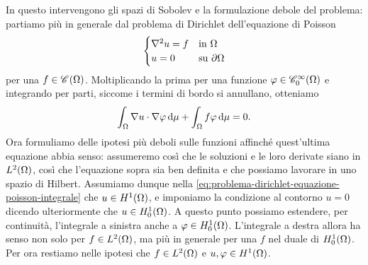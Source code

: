 In questo intervengono gli spazi di Sobolev e la formulazione debole del problema: partiamo più in generale dal problema di Dirichlet dell'equazione di Poisson
\begin{equation}
    \begin{cases}
        \lap u=f & \text{in }\Omega\\
        u=0      & \text{su }\boundary\Omega
    \end{cases}
    \label{eq:problema-dirichlet-equazione-poisson}
\end{equation}
per una $f\in\cont{\Omega}$.
Moltiplicando la prima per una funzione $\phi\in\contsc[\infty]{\Omega}$ e integrando per parti, siccome i termini di bordo si annullano, otteniamo
\begin{equation}
    \int_\Omega\scalar{\grad u}{\grad\phi}\,\dd\mu+\int_\Omega f\phi\,\dd\mu=0.
    \label{eq:problema-dirichlet-equazione-poisson-integrale}
\end{equation}
Ora formuliamo delle ipotesi più deboli sulle funzioni affinch\'e quest'ultima equazione abbia senso: assumeremo cos\`i che le soluzioni e le loro derivate siano in $\leb[2]{\Omega}$, cos\`i che l'equazione sopra sia ben definita e che possiamo lavorare in uno spazio di Hilbert.
Assumiamo dunque nella \eqref{eq:problema-dirichlet-equazione-poisson-integrale} che $u\in\sobH[1]{\Omega}$, e imponiamo la condizione al contorno $u=0$ dicendo ulteriormente che $u\in\sobHc[1]{\Omega}$.
A questo punto possiamo estendere, per continuità, l'integrale a sinistra anche a $\phi\in\sobHc[1]{\Omega}$.
L'integrale a destra allora ha senso non solo per $f\in\leb[2]{\Omega}$, ma più in generale per una $f$ nel duale di $\sobHc[1]{\Omega}$.
Per ora restiamo nelle ipotesi che $f\in\leb[2]{\Omega}$ e $u,\phi\in\sobH[1]{\Omega}$.
